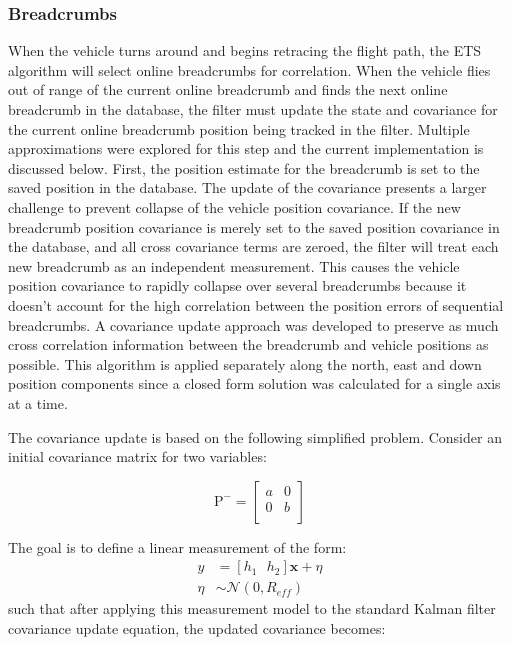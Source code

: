 \subsubsection{Breadcrumbs}

When the vehicle turns around and begins retracing the flight path, the ETS algorithm will select online breadcrumbs for correlation. When the vehicle flies out of range of the current online breadcrumb and finds the next online breadcrumb in the database, the filter must update the state and covariance for the current online breadcrumb position being tracked in the filter. Multiple approximations were explored for this step and the current implementation is discussed below.  First, the position estimate for the breadcrumb is set to the saved position in the database.  The update of the covariance presents a larger challenge to prevent collapse of the vehicle position covariance.  If the new breadcrumb position covariance is merely set to the saved position covariance in the database, and all cross covariance terms are zeroed, the filter will treat each new breadcrumb as an independent measurement.  This causes the vehicle position covariance to rapidly collapse over several breadcrumbs because it doesn't account for the high correlation between the position errors of sequential breadcrumbs.  A covariance update approach was developed to preserve as much cross correlation information between the breadcrumb and vehicle positions as possible.  This algorithm is applied separately along the north, east and down position components since a closed form solution was calculated for a single axis at a time.  

The covariance update is based on the following simplified problem.  Consider an initial covariance matrix for two variables:

\begin{equation}
    \text{P}^- = \left[ {\begin{array}{cc}
    a & 0 \\
    0 & b \\
  \end{array} } \right]
  \label{eq:blackmagic1}
\end{equation}

\noindent The goal is to define a linear measurement of the form:
\begin{align}
    y &= \left[ h_{1}\text{ }h_{2} \right] \textbf{x} + \eta \\
    \eta &\sim \mathcal{N}(0, R_{eff})
    \label{eq:blackmagic2}
\end{align}
\noindent such that after applying this measurement model to the standard Kalman filter covariance update equation, the updated covariance becomes:

